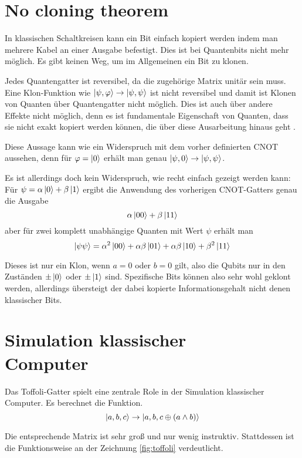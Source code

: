 \documentclass{acm_proc_article-sp}
\begin{document}
\section{No cloning theorem}
\label{noclone}

In klassischen Schaltkreisen kann ein Bit einfach kopiert werden indem man mehrere Kabel an einer Ausgabe befestigt. Dies ist
bei Quantenbits nicht mehr möglich. Es gibt keinen Weg, um im Allgemeinen ein Bit zu klonen.

Jedes Quantengatter ist reversibel, da die zugehörige Matrix unitär sein muss. 
Eine Klon-Funktion wie $\left|\psi,\varphi\right\rangle \rightarrow \left|\psi,\psi\right\rangle$ ist nicht reversibel und damit ist Klonen von Quanten über
Quantengatter nicht möglich. 
Dies ist auch über andere Effekte nicht möglich, denn es ist fundamentale Eigenschaft von Quanten, 
dass sie nicht exakt kopiert werden können, die über diese Ausarbeitung hinaus geht \cite{Barenco}.

Diese Aussage kann wie ein Widerspruch mit dem vorher definierten CNOT aussehen, denn für $\varphi=\left|0\right\rangle$ erhält man
genau $\left|\psi,0\right\rangle \rightarrow \left|\psi, \psi\right\rangle$.

Es ist allerdings doch kein Widerspruch, wie recht einfach gezeigt werden kann:
Für $\psi = \alpha \left|0\right\rangle + \beta \left|1\right\rangle$ ergibt die Anwendung des vorherigen CNOT-Gatters genau die Ausgabe
\[
    \alpha \left|00\right\rangle + \beta \left|11\right\rangle 
\]
aber für zwei komplett unabhängige Quanten mit Wert $\psi$ erhält man
\[
    \left|\psi \psi\right\rangle = \alpha^2 \left|00\right\rangle + \alpha\beta \left|01\right\rangle + \alpha\beta \left|10\right\rangle + \beta^2 \left|11\right\rangle 
\]

Dieses ist nur ein Klon, wenn $a=0$ oder $b=0$ gilt, also die Qubits nur in den Zuständen $\pm \left|0\right\rangle$ oder $\pm \left|1\right\rangle$ sind.
Spezifische Bits können also sehr wohl geklont werden, allerdings übersteigt der dabei kopierte Informationsgehalt
nicht denen klassischer Bits.

\section{Simulation klassischer \\ Computer}
\label{Simulate}

Das Toffoli-Gatter spielt eine zentrale Role in der Simulation klassischer Computer.
Es berechnet die Funktion.
\[
    \left|a, b, c\right\rangle \rightarrow \left|a, b, c\oplus (a\wedge b)\right\rangle
\]

Die entsprechende Matrix ist sehr groß und nur wenig instruktiv. Stattdessen ist
die Funktionsweise an der Zeichnung \ref{fig:toffoli} verdeutlicht.
\end{document}
